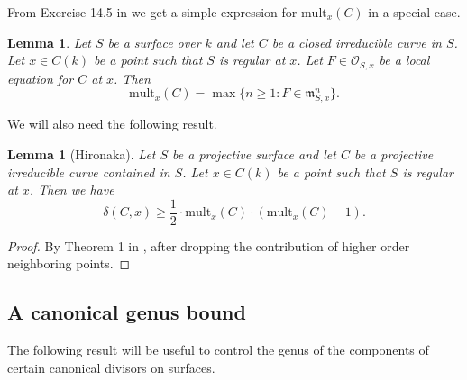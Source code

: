 \documentclass[11pt]{amsart}
\newtheorem{lemma}[theorem]{Lemma}
\theoremstyle{remark}
\numberwithin{equation}{section}
\newcommand{\mfrak}{\mathfrak{m}}
\newcommand{\Ocal}{\mathscr{O}}
\newcommand{\mult}{\mathrm{mult}}
\begin{document}
From Exercise 14.5 in \cite{Matsumura} we get a simple expression for $\mult_x(C)$ in a special case.

\begin{lemma}\label{LemmaMultFormula} Let $S$ be a surface over $k$ and let $C$ be a closed irreducible curve in $S$. Let $x\in C(k)$ be a point such that $S$ is regular at $x$. Let $F\in \Ocal_{S,x}$ be a local equation for $C$ at $x$. Then 
$$
\mult_x(C)=\max\{n\ge 1 : F\in \mfrak_{S,x}^n\}.
$$
\end{lemma}

We will also need the following result.
\begin{lemma}[Hironaka] \label{LemmaHironakaMult} Let $S$ be a projective surface and let $C$ be a projective irreducible curve contained in $S$. Let $x\in C(k)$ be a point such that $S$ is regular at $x$. Then we have
$$
\delta(C,x)\ge \frac{1}{2}\cdot \mult_x(C)\cdot (\mult_x(C)-1).
$$
\end{lemma}
\begin{proof} By Theorem 1 in \cite{Hironaka}, after dropping the contribution of higher order neighboring points.
\end{proof}

\subsection{A canonical genus bound} 

The following result will be useful to control the genus of the components of certain canonical divisors on surfaces. 
\end{document}
